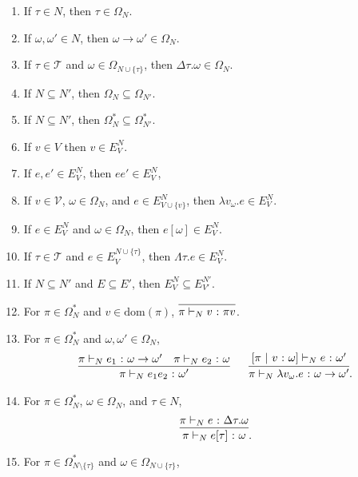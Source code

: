 \begin{frame}[allowframebreaks]
    \framebreak
    \begin{enumerate}
        \item If $\tau \in N$, then $\tau \in \Omega_N$.
        \item If $\omega, \omega' \in N$, then $\omega \rightarrow \omega' \in \Omega_N$.
        \item If $\tau \in \mathcal{T}$ and $\omega \in \Omega_{N \cup \{\tau\}}$, then $\Delta\tau. \omega \in \Omega_N$.
        \item If $N \subseteq N'$, then $\Omega_N \subseteq \Omega_{N'}$.
        \item If $N \subseteq N'$, then $\Omega^*_N \subseteq \Omega^*_{N'}$.
        \item If $v \in V$ then $v \in E_V^N$.
        \item If $e, e' \in E_V^N$, then $ee' \in E_V^N$,
        \item If $v \in \mathcal{V}$, $\omega \in \Omega_N$, and $e \in E_{V \cup \{v\}}^N$, then $\lambda v_\omega. e \in E_V^N$.
        \item If $e \in E_V^N$ and $\omega \in \Omega_N$, then $e[\omega] \in E_V^N$.
        \item If $\tau \in \mathcal{T}$ and $e \in E_V^{N \cup \{\tau\}}$, then $\Lambda\tau. e \in E_V^N$.
        \item If $N \subseteq N'$ and $E \subseteq E'$, then $E_V^N \subseteq E_{V'}^{N'}$.
        \framebreak
        \item For $\pi \in \Omega^*_N$ and $v \in \mathrm{dom}(\pi)$,
        $
        \infer{\pi \vdash_N v \colon \pi v}{}
        $.
        \item For $\pi \in \Omega^*_N$ and $\omega, \omega' \in \Omega_N$,
        \[
        \begin{matrix}
        \infer{\pi \vdash_N e_1e_2 \colon \omega'}{
            \pi \vdash_N e_1 \colon \omega \rightarrow \omega'
            &
            \pi \vdash_N e_2 \colon \omega
        }
        ~&~
        \infer{\pi \vdash_N \lambda v_\omega. e \colon \omega \rightarrow \omega'}{[\pi~|~v\colon\omega] \vdash_N e \colon \omega'}.
        \end{matrix}
        \]
        \setcounter{enumi}{14}
        \item For $\pi \in \Omega^*_N$, $\omega \in \Omega_N$, and $\tau \in N$,
        \[
        \infer{\pi \vdash_N e[\tau] \colon \omega}{\pi \vdash_N e \colon \Delta\tau. \omega}.
        \]
        \item For $\pi \in \Omega^*_{N \setminus \{\tau\}}$ and $\omega \in \Omega_{N \cup \{\tau\}}$,

\end{enumerate}
\end{frame}

